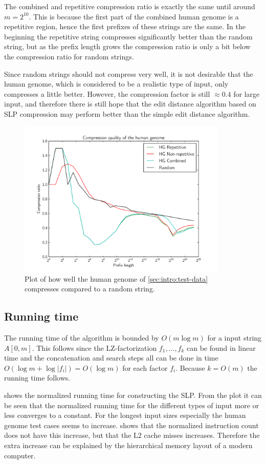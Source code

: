 \documentclass[twoside,11pt,openright]{report}
\newcommand{\str}[3]{#1[#2, #3]}
\begin{document}
The combined and repetitive compression ratio is exactly the same until around $m = 2^{10}$. This is because the first part of the combined human genome is a repetitive region, hence the first prefixes of these strings are the same. In the beginning the repetitive string compresses significantly better than the random string, but as the prefix length grows the compression ratio is only a bit below the compression ratio for random strings.

Since random strings should not compress very well, it is not desirable that the human genome, which is considered to be a realistic type of input, only compresses a little better. However, the compression factor is still $\approx 0.4$ for large input, and therefore there is still hope that the edit distance algorithm based on SLP compression may perform better than the simple edit distance algorithm.

\begin{figure}[h!]
  \centering
  \includegraphics[width=10cm]{compression/hg}
  \caption{Plot of how well the human genome of \cref{sec:intro:test-data} compresses compared to a random string.}
  \label{fig:compression:quality:hg}
\end{figure}

\subsection{Running time}
The running time of the algorithm is bounded by $O(m\log{m})$ for a input string $\str{A}{0}{m}$. This follows since the LZ-factorization $f_1, \dots, f_k$ can be found in linear time and the concatenation and search steps all can be done in time $O(\log{m} + \log{|f_i|}) = O(\log{m})$ for each factor $f_i$. Because $k = O(m)$ the running time follows.

 shows the normalized running time for constructing the SLP. From the plot it can be seen that the normalized running time for the different types of input more or less converges to a constant. For the longest input sizes especially the human genome test cases seems to increase.  shows that the normalized instruction count does not have this increase, but that the L2 cache misses increases. Therefore the extra increase can be explained by the hierarchical memory layout of a modern computer.
\end{document}

